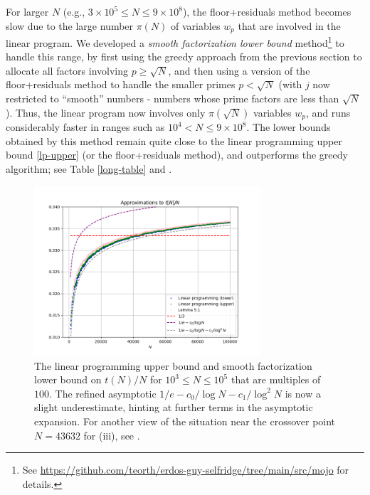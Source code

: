 \documentclass[12pt,a4paper,reqno]{amsart}
\numberwithin{equation}{section}
\theoremstyle{plain}
\theoremstyle{definition}
\begin{document}
For larger $N$ (e.g., $3 \times 10^5 \leq N \leq 9 \times 10^8$), the floor+residuals method becomes slow due to the large number $\pi(N)$ of variables $w_p$ that are involved in the linear program.  We developed a \emph{smooth factorization lower bound} method\footnote{See \url{https://github.com/teorth/erdos-guy-selfridge/tree/main/src/mojo} for details.} to handle this range, by first using the greedy approach from the previous section to allocate all factors involving $p \geq \sqrt{N}$, and then using a version of the floor+residuals method to handle the smaller primes $p < \sqrt{N}$ (with $j$ now restricted to ``smooth'' numbers - numbers whose prime factors are less than $\sqrt{N}$).  Thus, the linear program now involves only $\pi(\sqrt{N})$ variables $w_p$, and runs considerably faster in ranges such as $10^4 < N \leq 9 \times 10^8$.  The lower bounds obtained by this method remain quite close to the linear programming upper bound \eqref{lp-upper} (or the floor+residuals method), and outperforms the greedy algorithm; see Table \ref{long-table} and .


  \begin{figure}
    \centering
    \includegraphics[width=0.75\textwidth]{longerplot.png}
    \vspace{-12pt}
    \caption{\small The linear programming upper bound and smooth factorization lower bound on $t(N)/N$ for $10^3 \leq N \leq 10^5$ that are multiples of $100$. The refined asymptotic $1/e - c_0/\log N - c_1/\log^2 N$ is now a slight underestimate, hinting at further terms in the asymptotic expansion. For another view of the situation near the crossover point $N=43632$ for (iii), see .}
    \label{fig-longer}
    \end{figure}
\end{document}
